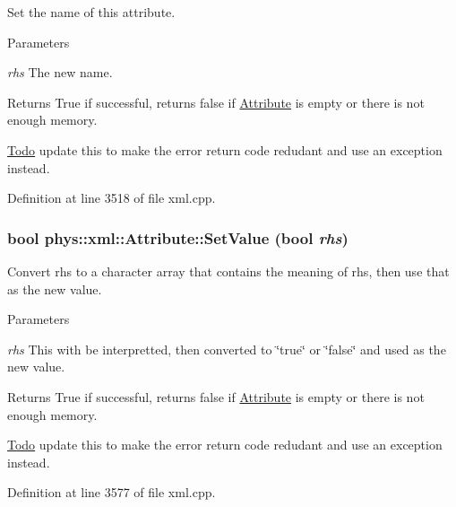 Set the name of this attribute. 


\begin{DoxyParams}{Parameters}
\item[{\em rhs}]The new name. \end{DoxyParams}
\begin{DoxyReturn}{Returns}
True if successful, returns false if \hyperlink{classphys_1_1xml_1_1Attribute}{Attribute} is empty or there is not enough memory. 
\end{DoxyReturn}
\begin{Desc}
\item[\hyperlink{todo__todo000047}{Todo}]update this to make the error return code redudant and use an exception instead. \end{Desc}


Definition at line 3518 of file xml.cpp.

\hypertarget{classphys_1_1xml_1_1Attribute_a6df4cf0f083482e69e4e6e94599a1d82}{
\subsubsection[{SetValue}]{\setlength{\rightskip}{0pt plus 5cm}bool phys::xml::Attribute::SetValue (bool {\em rhs})}}
\label{da/ddf/classphys_1_1xml_1_1Attribute_a6df4cf0f083482e69e4e6e94599a1d82}


Convert rhs to a character array that contains the meaning of rhs, then use that as the new value. 


\begin{DoxyParams}{Parameters}
\item[{\em rhs}]This with be interpretted, then converted to \char`\"{}true\char`\"{} or \char`\"{}false\char`\"{} and used as the new value. \end{DoxyParams}
\begin{DoxyReturn}{Returns}
True if successful, returns false if \hyperlink{classphys_1_1xml_1_1Attribute}{Attribute} is empty or there is not enough memory. 
\end{DoxyReturn}
\begin{Desc}
\item[\hyperlink{todo__todo000041}{Todo}]update this to make the error return code redudant and use an exception instead. \end{Desc}


Definition at line 3577 of file xml.cpp.

